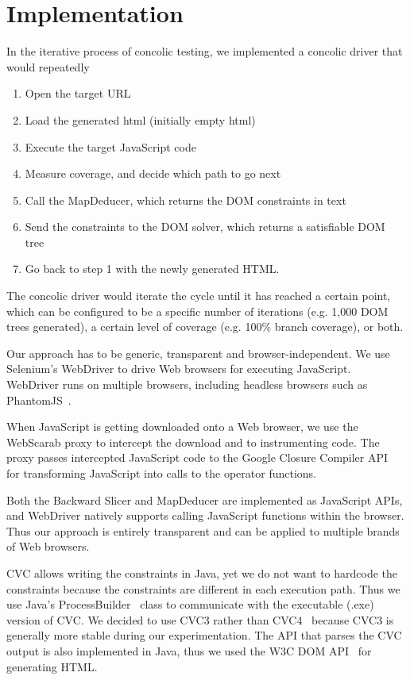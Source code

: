 \section{Implementation}
\label{impl}
In the iterative process of concolic testing, we implemented a concolic driver that would repeatedly
\begin {enumerate}
\item Open the target URL
\item Load the generated html (initially empty html)
\item Execute the target JavaScript code
\item Measure coverage, and decide which path to go next
\item Call the MapDeducer, which returns the DOM constraints in text
\item Send the constraints to the DOM solver, which returns a satisfiable DOM tree
\item Go back to step 1 with the newly generated HTML.
\end{enumerate}
The concolic driver would iterate the cycle until it has reached a certain point, which can be configured to be a specific number of iterations (e.g. 1,000 DOM trees generated), a certain level of coverage (e.g. 100\% branch coverage), or both. 


Our approach has to be generic, transparent and browser-independent.  
We use Selenium's WebDriver\cite{webdriverjs} to drive Web browsers for executing JavaScript.  WebDriver runs on multiple browsers, including headless browsers such as PhantomJS~\cite{phantomjs}.  

When JavaScript is getting downloaded onto a Web browser, we use the WebScarab proxy to intercept the download and to instrumenting code.  
The proxy passes intercepted JavaScript code to the Google Closure Compiler API~\cite{ClosureCompiler} for transforming JavaScript into calls to the operator functions. 

Both the Backward Slicer and MapDeducer are implemented as JavaScript APIs, and WebDriver natively supports calling JavaScript functions within the browser.  
Thus our approach is entirely transparent and can be applied to multiple brands of Web browsers.    


CVC allows writing the constraints in Java, yet we do not want to hardcode the constraints because the constraints are different in each execution path.  
Thus we use Java's ProcessBuilder~\cite{processbuilder} class to communicate with the executable (.exe) version of CVC.  We decided to use CVC3 rather than CVC4~\cite{cvc4} because CVC3 is generally more stable during our experimentation.  
The API that parses the CVC output is also implemented in Java, thus we used the W3C DOM API~\cite{DomAPI} for generating HTML.  



